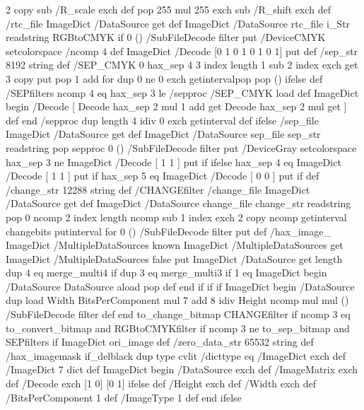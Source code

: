 {{{  2 copy sub /R_scale exch def pop 255 mul 255 exch sub /R_shift exch def
  /rtc_file ImageDict /DataSource get def
  ImageDict /DataSource {rtc_file i_Str readstring {RGBtoCMYK} if}
    0 () /SubFileDecode filter put
  /DeviceCMYK setcolorspace /ncomp 4 def
  ImageDict /Decode [0 1 0 1 0 1 0 1] put
} def
%
/sep_str 8192 string def
/SEP_CMYK {
  0
  hax_sep 4 3 index length 1 sub {
    2 index exch get
    3 copy put pop
    1 add
  } for
  dup 0 ne {0 exch getinterval}{pop pop ()} ifelse
} def
%
/SEPfilters {
  ncomp 4 eq {
    hax_sep 3 le {
      /sepproc /SEP_CMYK load def
      ImageDict begin /Decode [
        Decode hax_sep 2 mul 1 add get
        Decode hax_sep 2 mul get
      ] def end
    } {
      /sepproc {dup length 4 idiv 0 exch getinterval} def
    } ifelse
    /sep_file ImageDict /DataSource get def
    ImageDict /DataSource {sep_file sep_str readstring pop sepproc} 0 ()
      /SubFileDecode filter put
    /DeviceGray setcolorspace
  } {%
    hax_sep 3 ne {ImageDict /Decode [ 1 1 ] put} if
  } ifelse
  hax_sep 4 eq {ImageDict /Decode [ 1 1 ] put} if
  hax_sep 5 eq {ImageDict /Decode [ 0 0 ] put} if
} def
%
/change_str 12288 string def %
/CHANGEfilter {
  /change_file ImageDict /DataSource get def
  ImageDict /DataSource {
    change_file change_str readstring pop
    0 ncomp 2 index length ncomp sub {
      1 index exch 2 copy ncomp
      getinterval changebits putinterval
    } for
  } 0 () /SubFileDecode filter put
} def
%
/hax_image_ {
  ImageDict /MultipleDataSources known {
    ImageDict /MultipleDataSources get {
      ImageDict /MultipleDataSources false put
      ImageDict /DataSource get length
      dup 4 eq {merge_multi4} if
      dup 3 eq {merge_multi3} if
          1 eq {ImageDict begin /DataSource DataSource aload pop def end} if
    } if
  } if
  ImageDict begin
    /DataSource dup load Width BitsPerComponent mul 7 add 8 idiv
      Height ncomp mul mul () /SubFileDecode filter def
  end
  to_change_bitmap {CHANGEfilter} if
  ncomp 3 eq to_convert_bitmap and {RGBtoCMYKfilter} if
  ncomp 3 ne to_sep_bitmap and {SEPfilters} if
  ImageDict ori_image
} def
%
/zero_data_str 65532 string def %
/hax_imagemask {
  if_delblack {
    dup type cvlit /dicttype eq {
      /ImageDict exch def
    } {
      /ImageDict 7 dict def ImageDict begin
        /DataSource exch def
        /ImageMatrix exch def
        /Decode exch {[1 0]} {[0 1]} ifelse def
        /Height exch def
        /Width exch def
        /BitsPerComponent 1 def
        /ImageType 1 def
      end
    } ifelse
}}}}
